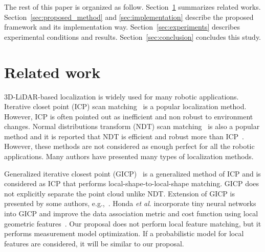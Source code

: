 \documentclass[letterpaper, 10 pt, conference]{ieeeconf}  %
\begin{document}
The rest of this paper is organized as follow.
Section~\ref{sec:related_work} summarizes related works.
Section~\ref{sec:proposed_method} and \ref{sec:implementation} describe the proposed framework and its implementation way.
Section~\ref{sec:experiments} describes experimental conditions and results.
Section~\ref{sec:conclusion} concludes this study.





























\section{Related work}
\label{sec:related_work}

3D-LiDAR-based localization is widely used for many robotic applications.
Iterative closet point (ICP) scan matching~\cite{Besl:1992:MRS:132013.132022} is a popular localization method.
However, ICP is often pointed out as inefficient and non robust to environment changes.
Normal distributions transform (NDT) scan matching~\cite{biber_iros2003:_ndt} is also a popular method and it is reported that NDT is efficient and robust more than ICP~\cite{Comparison_ICP_NDT}.
However, these methods are not considered as enough perfect for all the robotic applications.
Many authors have presented many types of localization methods.

Generalized iterative closest point (GICP)~\cite{GICP} is a generalized method of ICP and is considered as ICP that performs local-shape-to-local-shape matching.
GICP does not explicitly separate the point cloud unlike NDT.
Extension of GICP is presented by some authors, e.g.,~\cite{multi-channel-GICP}.
Honda {\it et al}. incorporate tiny neural networks into GICP and improve the data association metric and cost function using local geometric features~\cite{HondaRA-L2022}.
Our proposal does not perform local feature matching, but it performs measurement model optimization.
If a probabilistic model for local features are considered, it will be similar to our proposal.
\end{document}
